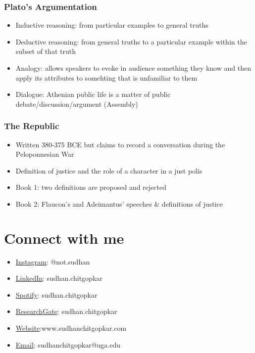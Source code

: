\documentclass[11pt]{article}
\begin{document}
\subsubsection{Plato's Argumentation}
\label{sec:orga37ca8a}
\begin{itemize}
\item Inductive reasoning: from particular examples to general truths
\item Deductive reasoning: from general truths to a particular example within the subset of that truth
\item Analogy: allows speakers to evoke in audience something they know and then apply its attributes
to somehting that is unfamiliar to them
\item Dialogue: Athenian public life is a matter of public debate/discussion/argument (Assembly)
\end{itemize}

\subsubsection{The Republic}
\label{sec:org4a17dcd}
\begin{itemize}
\item Written 380-375 BCE but claims to record a conversation during the Peloponnesian War
\item Definition of justice and the role of a character in a just polis
\item Book 1: two definitions are proposed and rejected
\item Book 2: Flaucon's and Adeimantus' speeches \& definitions of justice
\end{itemize}
\section{Connect with me}
\label{sec:orgec91a7b}
\begin{itemize}
\item \href{http://instagram.sudhanchitgopkar.com}{Instagram}: @not.sudhan
\item \href{https://www.linkedin.com/in/sudhanchitgopkar/}{LinkedIn}: sudhan.chitgopkar
\item \href{http://spotify.sudhanchitgopkar.com}{Spotify}: sudhan.chitgopkar
\item \href{http://research.sudhanchitgopkar.com}{ResearchGate}: sudhan.chitgopkar
\item \href{http://sudhanchitgopkar.com}{Website}:www.sudhanchitgopkar.com
\item \href{mailto:ssc10661@uga.edu}{Email}: sudhanchitgopkar@uga.edu
\end{itemize}
\end{document}
